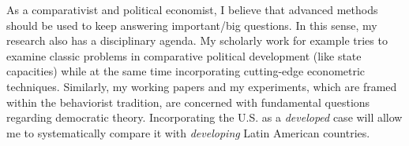 As a comparativist and political economist, I believe that advanced methods should be used to keep answering important/big questions. In this sense, my research also has a disciplinary agenda. My scholarly work for example tries to examine classic problems in comparative political development (like state capacities) while at the same time incorporating cutting-edge econometric techniques. Similarly, my working papers and my experiments, which are framed within the behaviorist tradition, are concerned with fundamental questions regarding democratic theory. Incorporating the U.S. as a \emph{developed} case will allow me to systematically compare it with \emph{developing} Latin American countries.